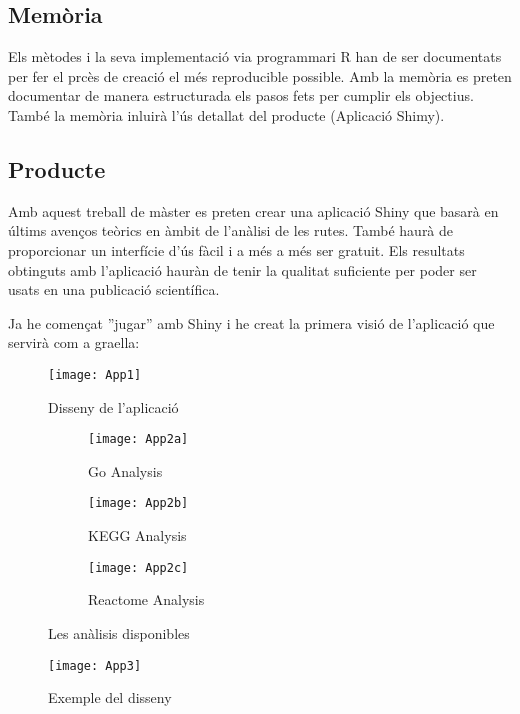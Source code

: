 \documentclass[]{article}
\begin{document}
\subsection{Memòria}

Els mètodes i la seva implementació via programmari R han de ser documentats per fer el prcès de creació el més reproducible possible. Amb la memòria es preten documentar de manera estructurada els pasos fets per cumplir els objectius. També la memòria inluirà l'ús detallat del producte (Aplicació Shimy).

\subsection{Producte}
Amb aquest treball de màster es preten crear una aplicació Shiny que basarà en últims avenços teòrics en àmbit de l'anàlisi de les rutes. També haurà de proporcionar un interfície d'ús fàcil i a més a més ser gratuit. Els resultats obtinguts amb l'aplicació hauràn de tenir la qualitat suficiente per poder ser usats en una publicació scientífica.

Ja he començat ''jugar'' amb Shiny i he creat la primera visió de l'aplicació que servirà com a graella:

\begin{figure}[H]
\caption{Disseny de l'aplicació}
\centering
\texttt{[image: App1]}
\end{figure}

\begin{figure}[h!]
  \centering
  \begin{subfigure}[b]{0.4\linewidth}
    \texttt{[image: App2a]}
    \caption{Go Analysis}
  \end{subfigure}
  \begin{subfigure}[b]{0.4\linewidth}
    \texttt{[image: App2b]}
    \caption{KEGG Analysis}
  \end{subfigure}
    \begin{subfigure}[b]{0.4\linewidth}
    \texttt{[image: App2c]}
    \caption{Reactome Analysis}
  \end{subfigure}
  \caption{Les anàlisis disponibles}
  \label{fig:coutput}
\end{figure}

 
\begin{figure}
\caption{Exemple del disseny}
\centering
\texttt{[image: App3]}
\end{figure}
\end{document}

